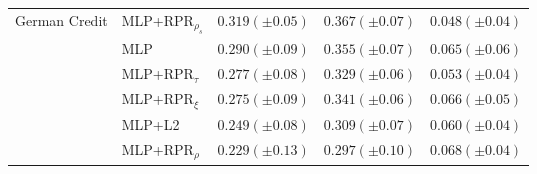 \begin{tabular}{lllll}
\multirow[t]{6}{*}{German Credit} & MLP+RPR$_{\rho_s}$ & $0.319 (\pm0.05)$ & $0.367 (\pm0.07)$ & $0.048 (\pm0.04)$ \\
 & MLP & $0.290 (\pm0.09)$ & $0.355 (\pm0.07)$ & $0.065 (\pm0.06)$ \\
 & MLP+RPR$_{\tau}$ & $0.277 (\pm0.08)$ & $0.329 (\pm0.06)$ & $0.053 (\pm0.04)$ \\
 & MLP+RPR$_{\xi}$ & $0.275 (\pm0.09)$ & $0.341 (\pm0.06)$ & $0.066 (\pm0.05)$ \\
 & MLP+L2 & $0.249 (\pm0.08)$ & $0.309 (\pm0.07)$ & $0.060 (\pm0.04)$ \\
 & MLP+RPR$_{\rho}$ & $0.229 (\pm0.13)$ & $0.297 (\pm0.10)$ & $0.068 (\pm0.04)$ \\
\cline{1-5}
\bottomrule
\end{tabular}
